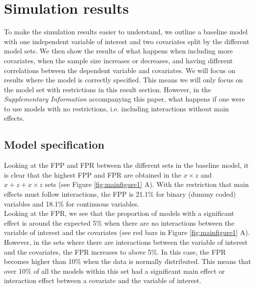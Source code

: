 \section{Simulation results} 
To make the simulation results easier to understand, we outline a baseline model with one independent variable of interest and two covariates split by the different model sets. We then show the results of what happens when including more covariates, when the sample size increases or decreases, and having different correlations between the dependent variable and covariates. We will focus on results where the model is correctly specified. This means we will only focus on the model set with restrictions in this result section. However, in the \textit{Supplementary Information} accompanying this paper, what happens if one were to use models with no restrictions, i.e. including interactions without main effects. 

\subsection{Model specification}
Looking at the FPP and FPR between the different sets in the baseline model, it is clear that the highest FPP and FPR are obtained in the $x \times z$ and $x + z+ x \times z$ sets (see Figure \ref{fig:mainfigure1} A). With the restriction that main effects must follow interactions, the FPP is 21.1\% for binary (dummy coded) variables and 18.1\% for continuous variables. \\ 
Looking at the FPR, we see that the proportion of models with a significant effect is around the expected 5\% when there are no interactions between the variable of interest and the covariates (see red bars in Figure \ref{fig:mainfigure1} A). However, in the sets where there are interactions between the variable of interest and the covariates, the FPR increases to above 5\%. In this case, the FPR becomes higher than 10\% when the data is normally distributed. This means that over 10\% of all the models within this set had a significant main effect or interaction effect between a covariate and the variable of interest. 
 \\

